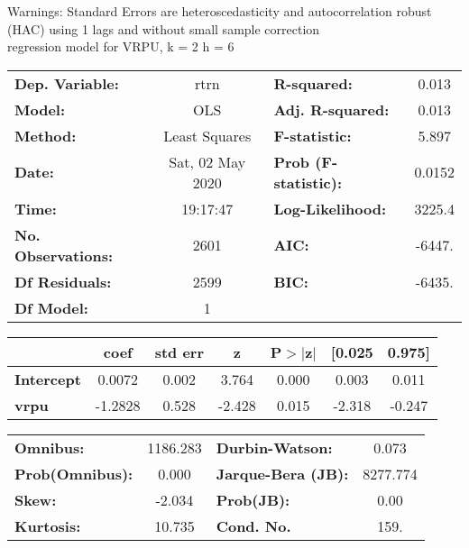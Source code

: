 Warnings: \newline
 [1] Standard Errors are heteroscedasticity and autocorrelation robust (HAC) using 1 lags and without small sample correction\\ 

regression model for VRPU, k = 2 h = 6\begin{center}
\begin{tabular}{lclc}
\toprule
\textbf{Dep. Variable:}    &       rtrn       & \textbf{  R-squared:         } &     0.013   \\
\textbf{Model:}            &       OLS        & \textbf{  Adj. R-squared:    } &     0.013   \\
\textbf{Method:}           &  Least Squares   & \textbf{  F-statistic:       } &     5.897   \\
\textbf{Date:}             & Sat, 02 May 2020 & \textbf{  Prob (F-statistic):} &   0.0152    \\
\textbf{Time:}             &     19:17:47     & \textbf{  Log-Likelihood:    } &    3225.4   \\
\textbf{No. Observations:} &        2601      & \textbf{  AIC:               } &    -6447.   \\
\textbf{Df Residuals:}     &        2599      & \textbf{  BIC:               } &    -6435.   \\
\textbf{Df Model:}         &           1      & \textbf{                     } &             \\
\bottomrule
\end{tabular}
\begin{tabular}{lcccccc}
                   & \textbf{coef} & \textbf{std err} & \textbf{z} & \textbf{P$> |$z$|$} & \textbf{[0.025} & \textbf{0.975]}  \\
\midrule
\textbf{Intercept} &       0.0072  &        0.002     &     3.764  &         0.000        &        0.003    &        0.011     \\
\textbf{vrpu}      &      -1.2828  &        0.528     &    -2.428  &         0.015        &       -2.318    &       -0.247     \\
\bottomrule
\end{tabular}
\begin{tabular}{lclc}
\textbf{Omnibus:}       & 1186.283 & \textbf{  Durbin-Watson:     } &    0.073  \\
\textbf{Prob(Omnibus):} &   0.000  & \textbf{  Jarque-Bera (JB):  } & 8277.774  \\
\textbf{Skew:}          &  -2.034  & \textbf{  Prob(JB):          } &     0.00  \\
\textbf{Kurtosis:}      &  10.735  & \textbf{  Cond. No.          } &     159.  \\
\bottomrule
\end{tabular}
\end{center}

